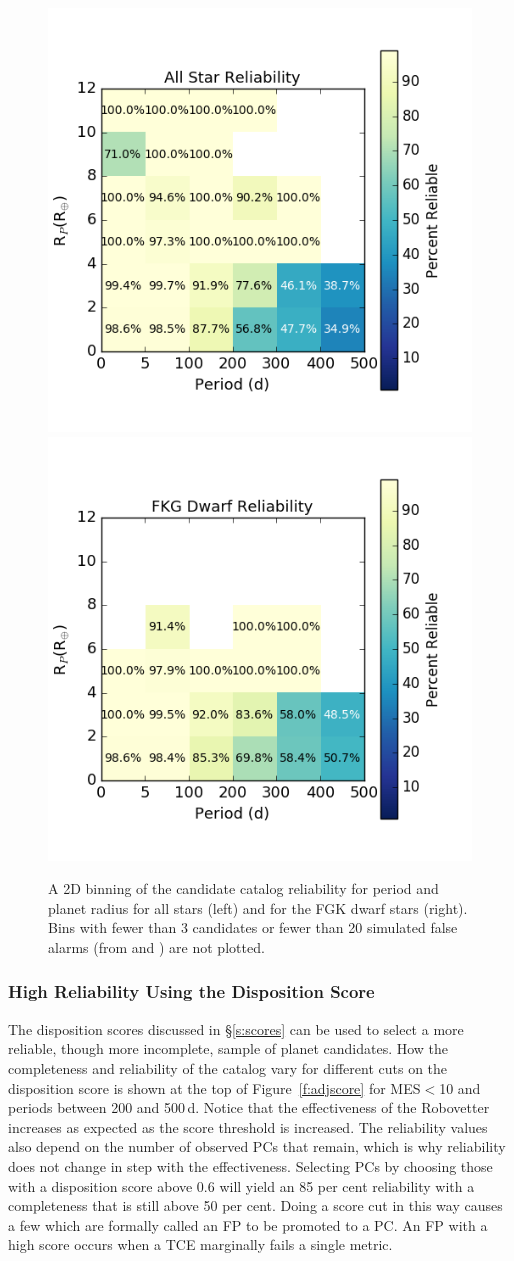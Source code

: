 \begin{figure}[h!]
\begin{center}
\includegraphics[width=0.45\linewidth]{fig-AllReliabilityPR.png}
\includegraphics[width=0.45\linewidth]{fig-FgkReliabilityPR.png}
\caption{A 2D binning of the candidate catalog reliability for period and planet radius for all stars (left) and for the FGK dwarf stars (right). Bins with fewer than 3 candidates or fewer than 20 simulated false alarms (from \invtce{} and \scrtce{}) are not plotted.}
\label{f:prReliability}
\end{center}
\end{figure}



\subsubsection{High Reliability Using the Disposition Score}
\label{s:crscores}
The disposition scores discussed in \S\ref{s:scores} can be used to select a more reliable, though more incomplete, sample of planet candidates.  How the completeness and reliability of the catalog vary for different cuts on the disposition score is shown at the top of Figure~\ref{f:adjscore} for MES$<$10 and periods between 200 and 500\,d. 
Notice that the effectiveness of the Robovetter increases as expected as the score threshold is increased. The reliability values also depend on the number of observed PCs that remain, which is why reliability does not change in step with the effectiveness.
Selecting PCs by choosing those with a disposition score above 0.6 will yield an 85 per cent reliability with a completeness that is still above 50 per cent. Doing a score cut in this way causes a few  which are formally called an FP to be promoted to a PC. An FP with a high score occurs when a TCE marginally fails a single metric.  

